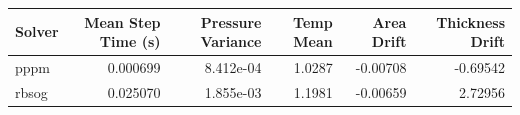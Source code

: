 \begin{tabular}{lrrrrr}
\toprule
Solver & Mean Step Time (s) & Pressure Variance & Temp Mean & Area Drift & Thickness Drift \\
\midrule
pppm & 0.000699 & 8.412e-04 & 1.0287 & -0.00708 & -0.69542 \\
rbsog & 0.025070 & 1.855e-03 & 1.1981 & -0.00659 & 2.72956 \\
\bottomrule
\end{tabular}
